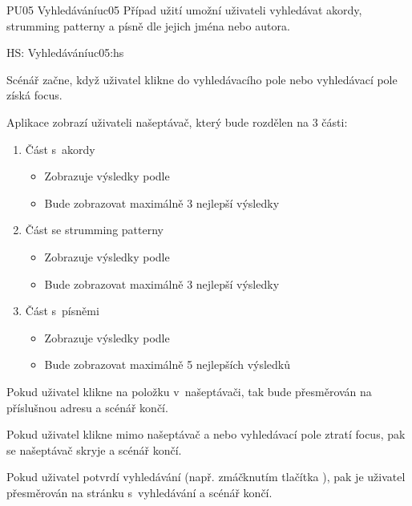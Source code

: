 \begin{usecase}{PU05 Vyhledávání}{uc05}
    Případ užití umožní uživateli vyhledávat akordy, strumming patterny a písně dle jejich jména nebo autora.

    \begin{scenario}{HS: Vyhledávání}{uc05:hs}
        \item Scénář začne, když uživatel klikne do vyhledávacího pole nebo vyhledávací pole získá focus.
        \item Aplikace zobrazí uživateli našeptávač, který bude rozdělen na 3 části:
        \begin{enumerate}
            \item Část s~akordy
                  \begin{itemize}
                      \item Zobrazuje výsledky podle 
                      \item Bude zobrazovat maximálně 3 nejlepší výsledky
                  \end{itemize}
            \item Část se strumming patterny
                  \begin{itemize}
                      \item Zobrazuje výsledky podle 
                      \item Bude zobrazovat maximálně 3 nejlepší výsledky
                  \end{itemize}
            \item Část s~písněmi
                  \begin{itemize}
                      \item Zobrazuje výsledky podle 
                      \item Bude zobrazovat maximálně 5 nejlepších výsledků
                  \end{itemize}
        \end{enumerate}
        \item Pokud uživatel klikne na položku v~našeptávači, tak bude přesměrován na příslušnou adresu a scénář končí.
        \item Pokud uživatel klikne mimo našeptávač a nebo vyhledávací pole ztratí focus, pak se našeptávač skryje a scénář končí.
        \item Pokud uživatel potvrdí vyhledávání (např. zmáčknutím tlačítka ), pak je uživatel přesměrován na stránku s~vyhledávání a scénář končí.
    \end{scenario}


\end{usecase}

